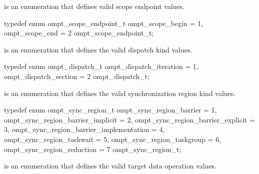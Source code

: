 
\label{sec:ompt_scope_endpoint_t}
 is an enumeration that defines valid scope endpoint values.


\begin{ccppspecific}
\begin{omptEnum}
typedef enum ompt_scope_endpoint_t {
  ompt_scope_begin                    = 1,
  ompt_scope_end                      = 2
} ompt_scope_endpoint_t;
\end{omptEnum}
\end{ccppspecific}




\label{sec:ompt_dispatch_t}
 is an enumeration that defines the valid dispatch kind values.


\begin{ccppspecific}
\begin{omptEnum}
typedef enum ompt_dispatch_t {
  ompt_dispatch_iteration             = 1,
  ompt_dispatch_section               = 2
} ompt_dispatch_t;
\end{omptEnum}
\end{ccppspecific}




\label{sec:ompt_sync_region_t}
 is an enumeration that defines the valid synchronization region kind values.


\begin{ccppspecific}
\begin{omptEnum}
typedef enum ompt_sync_region_t {
  ompt_sync_region_barrier                = 1,
  ompt_sync_region_barrier_implicit       = 2,
  ompt_sync_region_barrier_explicit       = 3,
  ompt_sync_region_barrier_implementation = 4,
  ompt_sync_region_taskwait               = 5,
  ompt_sync_region_taskgroup              = 6,
  ompt_sync_region_reduction              = 7
} ompt_sync_region_t;
\end{omptEnum}
\end{ccppspecific}





\label{sec:ompt_target_data_op_t}
 is an enumeration that defines the valid target data operation values.


